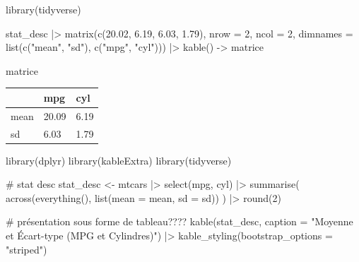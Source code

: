 \documentclass{article}
\newenvironment{Shaded}{\begin{snugshade}}{\end{snugshade}}
\newcommand{\AttributeTok}[1]{\textcolor[rgb]{0.40,0.45,0.13}{#1}}
\newcommand{\CommentTok}[1]{\textcolor[rgb]{0.37,0.37,0.37}{#1}}
\newcommand{\DecValTok}[1]{\textcolor[rgb]{0.68,0.00,0.00}{#1}}
\newcommand{\FloatTok}[1]{\textcolor[rgb]{0.68,0.00,0.00}{#1}}
\newcommand{\FunctionTok}[1]{\textcolor[rgb]{0.28,0.35,0.67}{#1}}
\newcommand{\NormalTok}[1]{\textcolor[rgb]{0.00,0.23,0.31}{#1}}
\newcommand{\OtherTok}[1]{\textcolor[rgb]{0.00,0.23,0.31}{#1}}
\newcommand{\SpecialCharTok}[1]{\textcolor[rgb]{0.37,0.37,0.37}{#1}}
\newcommand{\StringTok}[1]{\textcolor[rgb]{0.13,0.47,0.30}{#1}}
\begin{document}
\begin{Shaded}
\begin{Highlighting}[]
\FunctionTok{library}\NormalTok{(tidyverse)}

\NormalTok{stat\_desc }\SpecialCharTok{|\textgreater{}} \FunctionTok{matrix}\NormalTok{(}\FunctionTok{c}\NormalTok{(}\FloatTok{20.02}\NormalTok{, }\FloatTok{6.19}\NormalTok{, }\FloatTok{6.03}\NormalTok{, }\FloatTok{1.79}\NormalTok{), }\AttributeTok{nrow =} \DecValTok{2}\NormalTok{, }
             \AttributeTok{ncol =} \DecValTok{2}\NormalTok{, }\AttributeTok{dimnames =} \FunctionTok{list}\NormalTok{(}\FunctionTok{c}\NormalTok{(}\StringTok{"mean"}\NormalTok{, }\StringTok{"sd"}\NormalTok{),}
             \FunctionTok{c}\NormalTok{(}\StringTok{"mpg"}\NormalTok{, }\StringTok{"cyl"}\NormalTok{))) }\SpecialCharTok{|\textgreater{}} \FunctionTok{kable}\NormalTok{() }\OtherTok{{-}\textgreater{}}\NormalTok{ matrice}

\NormalTok{matrice}
\end{Highlighting}
\end{Shaded}

{\def\LTcaptype{none} %
\begin{longtable}[]{@{}lll@{}}
\toprule\noalign{}
& mpg & cyl \\
\midrule\noalign{}
\endhead
\bottomrule\noalign{}
\endlastfoot
mean & 20.09 & 6.19 \\
sd & 6.03 & 1.79 \\
\end{longtable}
}

\begin{Shaded}
\begin{Highlighting}[]
\FunctionTok{library}\NormalTok{(dplyr)}
\FunctionTok{library}\NormalTok{(kableExtra)}
\FunctionTok{library}\NormalTok{(tidyverse)}

\CommentTok{\# stat desc}
\NormalTok{stat\_desc }\OtherTok{\textless{}{-}}\NormalTok{ mtcars }\SpecialCharTok{|\textgreater{}} 
  \FunctionTok{select}\NormalTok{(mpg, cyl) }\SpecialCharTok{|\textgreater{}} 
  \FunctionTok{summarise}\NormalTok{(}
    \FunctionTok{across}\NormalTok{(}\FunctionTok{everything}\NormalTok{(), }\FunctionTok{list}\NormalTok{(}\AttributeTok{mean =}\NormalTok{ mean, }\AttributeTok{sd =}\NormalTok{ sd))}
\NormalTok{  ) }\SpecialCharTok{|\textgreater{}} 
  \FunctionTok{round}\NormalTok{(}\DecValTok{2}\NormalTok{)}

\CommentTok{\# présentation sous forme de tableau????}
\FunctionTok{kable}\NormalTok{(stat\_desc, }\AttributeTok{caption =} \StringTok{"Moyenne et Écart{-}type (MPG et Cylindres)"}\NormalTok{) }\SpecialCharTok{|\textgreater{}} 
  \FunctionTok{kable\_styling}\NormalTok{(}\AttributeTok{bootstrap\_options =} \StringTok{"striped"}\NormalTok{)}
\end{Highlighting}
\end{Shaded}
\end{document}
